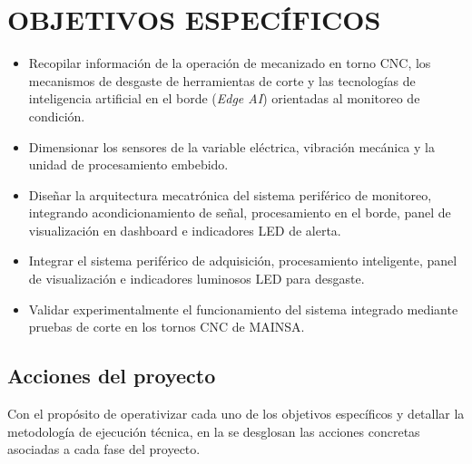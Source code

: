 \section{OBJETIVOS ESPECÍFICOS}

\begin{itemize}
\item Recopilar información de la operación de mecanizado en torno CNC, los mecanismos de desgaste de herramientas de corte y las tecnologías de inteligencia artificial en el borde (\textit{Edge AI}) orientadas al monitoreo de condición.
\item Dimensionar los sensores de la variable eléctrica, vibración mecánica y la unidad de procesamiento embebido.
\item Diseñar la arquitectura mecatrónica del sistema periférico de monitoreo, integrando acondicionamiento de señal, procesamiento en el borde, panel de visualización en dashboard e indicadores LED de alerta.
\item Integrar el sistema periférico de adquisición, procesamiento inteligente, panel de visualización e indicadores luminosos LED para desgaste.
\item Validar experimentalmente el funcionamiento del sistema integrado mediante pruebas de corte en los tornos CNC de MAINSA.
\end{itemize}

\subsection{Acciones del proyecto}
Con el propósito de operativizar cada uno de los objetivos específicos y detallar la metodología de ejecución técnica, en la  se desglosan las acciones concretas asociadas a cada fase del proyecto.

